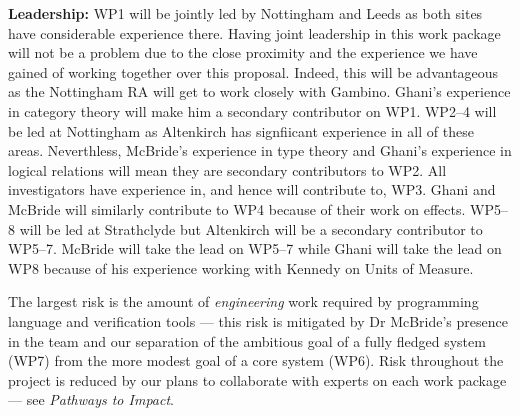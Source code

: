 \documentclass[a4paper,11pt]{article}
\begin{document}
{\bf Leadership:} WP1 will be jointly led by Nottingham and Leeds as
both sites have considerable experience there. Having joint leadership
in this work package will not be a problem due to the close proximity
and the experience we have gained of working together over this
proposal. Indeed, this will be advantageous as the Nottingham RA will
get to work closely with Gambino. Ghani's experience in category
theory will make him a secondary contributor on WP1. WP2--4 will be led
at Nottingham as Altenkirch has signfiicant experience in all of these
areas. Neverthless, McBride's experience in type theory and Ghani's
experience in logical relations will mean they are secondary
contributors to WP2. All investigators have experience in, and hence
will contribute to, WP3. Ghani and McBride will similarly contribute
to WP4 because of their work on effects. WP5--8 will be led at
Strathclyde but Altenkirch will be a secondary contributor to
WP5--7. McBride will take the lead on WP5--7 while Ghani will take
the lead on WP8 because of his experience working with Kennedy on
Units of Measure.

The largest risk is the 
amount of {\em engineering} work required by programming language
and verification tools --- this risk is mitigated by Dr McBride's
presence in the team and our 
separation of the ambitious
goal of a fully fledged system (WP7) from the more modest
goal of a core system (WP6). Risk throughout the project is reduced by
our plans to collaborate
with experts on each work package --- see {\em Pathways to Impact}. 
\end{document}
